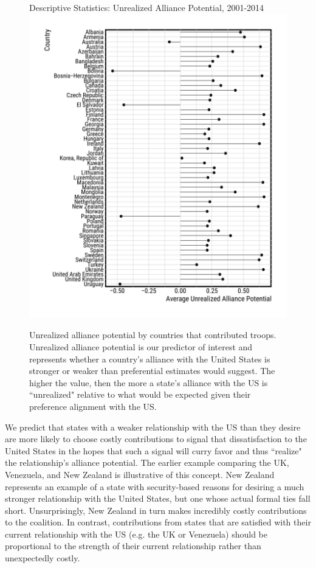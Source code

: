 \documentclass[12pt,letterpaper]{article}
\begin{document}
		\begin{figure}[p!]
			\begin{center}
				Descriptive Statistics: Unrealized Alliance Potential, 2001-2014
				\vspace{-1em}
				\hspace{-5em}\includegraphics[height = 0.9\textheight]{figures/descriptive_stats.pdf}
				\caption{Unrealized alliance potential by countries that contributed troops. Unrealized alliance potential is our predictor of interest and represents whether a country's alliance with the United States is stronger or weaker than preferential estimates would suggest. The higher the value, then the more a state's alliance with the US is ``unrealized" relative to what would be expected given their preference alignment with the US.}
				\label{fig:measure_comparison_alliances}
			\end{center}
		\end{figure}

		We predict that states with a weaker relationship with the US than they desire are more likely to choose costly contributions to signal that dissatisfaction to the United States in the hopes that such a signal will curry favor and thus ``realize" the relationship's alliance potential. The earlier example comparing the UK, Venezuela, and New Zealand is illustrative of this concept. New Zealand represents an example of a state with security-based reasons for desiring a much stronger relationship with the United States, but one whose actual formal ties fall short. Unsurprisingly, New Zealand in turn makes incredibly costly contributions to the coalition. In contrast, contributions from states that are satisfied with their current relationship with the US (e.g. the UK or Venezuela) should be proportional to the strength of their current relationship rather than unexpectedly costly.
						
\end{document}
